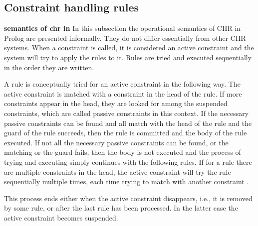 \documentclass[thesis-solanki.tex]{subfiles}
\begin{document}
\subsection{Constraint handling rules}
\textbf{semantics of chr in } 
In this subsection the operational semantics of CHR
in Prolog are presented informally. They do not differ essentially from other CHR systems.
When a constraint
is called, it is considered an active constraint and the system will try to apply the rules to it. Rules are tried and executed sequentially in the order they are written.




A rule is conceptually tried for an active constraint in the following way.
The active constraint is matched with a constraint in the head of the rule.
If more constraints appear in the head, they are looked for among the suspended constraints, which are called
passive constraints in this context.
If the necessary passive constraints can be found and all match with the head of the rule and the guard of the rule
succeeds, then the rule is committed and the body of the rule executed.
If not all the necessary passive constraints can be found, or the matching or the guard fails, then the body is not
executed and the process of trying and executing simply continues with the following rules.
If for a rule there are multiple constraints in the head, the active constraint will try the rule sequentially
multiple times, each time trying to match with another constraint \cite{website:swiprologsyntaxandsemantics}.

This process ends either when the active constraint disappears, i.e., it is removed by some rule, or
after the last rule has been processed.
In the latter case the active constraint becomes suspended.
\end{document}

